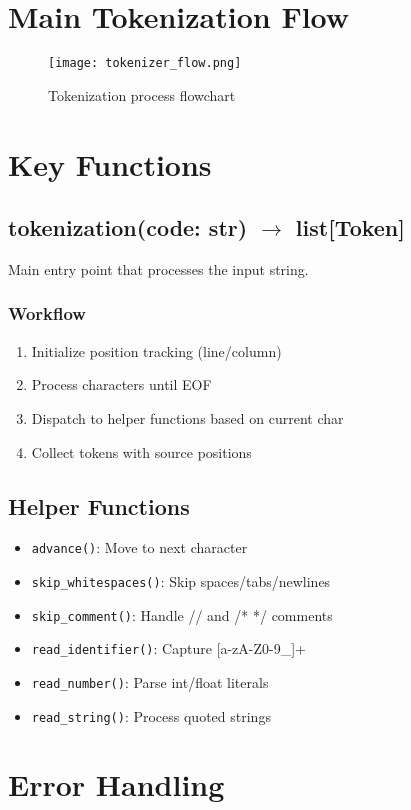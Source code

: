 \documentclass{article}
\begin{document}
\section{Main Tokenization Flow}
\begin{figure}[h]
\centering
\texttt{[image: tokenizer\_flow.png]}
\caption{Tokenization process flowchart}
\end{figure}

\section{Key Functions}
\subsection{tokenization(code: str) $\rightarrow$ list[Token]}
Main entry point that processes the input string.

\subsubsection{Workflow}
\begin{enumerate}
    \item Initialize position tracking (line/column)
    \item Process characters until EOF
    \item Dispatch to helper functions based on current char
    \item Collect tokens with source positions
\end{enumerate}

\subsection{Helper Functions}
\begin{itemize}
    \item \texttt{advance()}: Move to next character
    \item \texttt{skip\_whitespaces()}: Skip spaces/tabs/newlines
    \item \texttt{skip\_comment()}: Handle // and /* */ comments
    \item \texttt{read\_identifier()}: Capture [a-zA-Z0-9\_]+
    \item \texttt{read\_number()}: Parse int/float literals
    \item \texttt{read\_string()}: Process quoted strings
\end{itemize}

\section{Error Handling}
\end{document}
